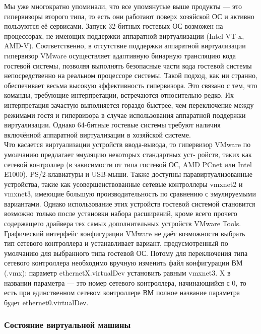 \documentclass[14pt, a4paper]{article}
\begin{document}
Мы уже многократно упоминали, что все упомянутые выше продукты — это гипервизоры второго типа,
то есть они работают поверх хозяйской ОС и активно пользуются её сервисами. Запуск 32-битных
гостевых ОС возможен на процессорах, не имеющих поддержки аппаратной виртуализации (Intel VT-x,
AMD-V). Соответственно, в отсутствие поддержки аппаратной виртуализации гипервизор VMware
осуществляет адаптивную бинарную трансляцию кода гостевой системы, позволяя выполнять
безопасные части кода гостевой системы непосредственно на реальном процессоре системы. Такой
подход, как ни странно, обеспечивает весьма высокую эффективность гипервизора. Это связано с
тем, что команды, требующие интерпретации, встречаются относительно редко. Их интерпретация
зачастую выполняется гораздо быстрее, чем переключение между режимами гостя и гипервизора в
случае использования аппаратной поддержки виртуализации. Однако 64-битные гостевые системы
требуют наличия включённой аппаратной виртуализации в хозяйской системе.\\

Что касается виртуализации устройств ввода-вывода, то гипервизор VMware по умолчанию
предлагает эмуляцию некоторых стандартных уст- ройств, таких как сетевой контроллер (в зависимости
от типа гостевой ОС, AMD PCnet или Intel E1000), PS/2-клавиатуры и USB-мыши. Также доступны
паравиртуализованные устройства, такие как усовершенствованные сетевые контроллеры vmxnet2 и
vmxnet3, имеющие большую производительность по сравнению с эмулируемыми вариантами. Однако
использование этих устройств гостевой системой становится возможно только после установки
набора расширений, кроме всего прочего содержащего драйвера тех самых дополнительных
устройств VMware Tools.\\

Графический интерфейс конфигурации VMware не даёт возможности выбрать тип сетевого
контроллера и устанавливает вариант, предусмотренный по умолчанию для выбранного типа гостевой
ОС. Потому для переключения типа сетевого контроллера необходимо вручную изменить файл
конфигурации ВМ (.vmx): параметр \colorbox{backcolour}{ethernetX.virtualDev} установить равным \colorbox{backcolour}{vmxnet3.} X в
названии параметра — это номер сетевого контроллера, начинающийся с 0, то есть при единственном
сетевом контроллере ВМ полное название параметра будет \colorbox{backcolour}{ethernet0.virtualDev}.

\subsubsection*{Состояние виртуальной машины}
\end{document}
